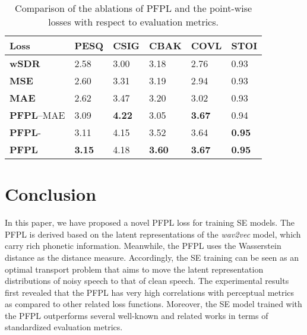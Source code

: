 \documentclass[a4paper]{article}
\begin{document}
\begin{table}[t]
\caption{Comparison of the ablations of PFPL and the point-wise losses with respect to evaluation metrics.}
\centering
\small
\begin{tabular*}{\linewidth}{l|P{7.2mm} P{7.2mm} P{7.2mm} P{7.2mm} P{7.2mm}}
\hline
Loss & PESQ & CSIG & CBAK & COVL & STOI\\
\hline
\hline
\textbf{wSDR \cite{choi2018phase}} & 2.58 & 3.00 & 3.18 & 2.76 & 0.93\\
\textbf{MSE} & 2.60 & 3.31 & 3.19 & 2.94 & 0.93\\
\textbf{MAE} & 2.62 & 3.47 & 3.20 & 3.02 & 0.93\\
\hline
\hline
\textbf{PFPL}--MAE & 3.09 & \textbf{4.22} & 3.05 & \textbf{3.67} & 0.94\\
\textbf{PFPL}- & 3.11 & 4.15 & 3.52 & 3.64 & \textbf{0.95}\\
\textbf{PFPL}& \textbf{3.15} & 4.18 & \textbf{3.60} & \textbf{3.67} & \textbf{0.95}\\
\hline
\end{tabular*}
\label{tab:losses}
\end{table}


\section{Conclusion}
\label{sec:conclusion}
In this paper, we have proposed a novel PFPL loss for training SE models. The PFPL is derived based on the latent representations of the {\it wav2vec} model, which carry rich phonetic information. Meanwhile, the PFPL uses the Wasserstein distance as the distance measure. Accordingly, the SE training can be seen as an optimal transport problem that aims to move the latent representation distributions of noisy speech to that of clean speech. The experimental results first revealed that the PFPL has very high correlations with perceptual metrics as  compared to other related loss functions. Moreover, the SE model trained with the PFPL outperforms several well-known and related works in terms of standardized evaluation metrics. 
\vfill\pagebreak




\end{document}
